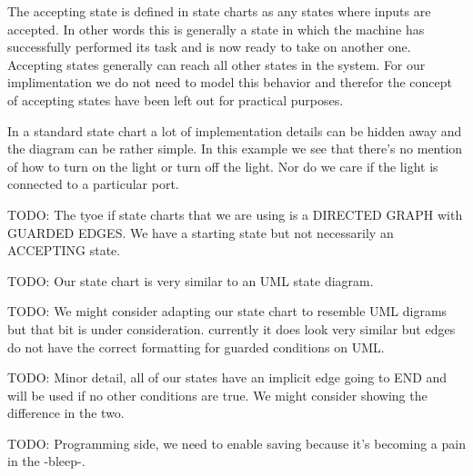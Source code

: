The accepting state is defined in state charts as any states where inputs are accepted. In other words this is generally a state in which the machine has successfully performed its task and is now ready to take on another one. Accepting states generally can reach all other states in the system. For our implimentation we do not need to model this behavior and therefor the concept of accepting states have been left out for practical purposes.

In a standard state chart a lot of implementation details can be hidden away and the diagram can be rather simple. In this example we see that there's no mention of how to turn on the light or turn off the light. Nor do we care if the light is connected to a particular port.

TODO: The tyoe if state charts that we are using is a DIRECTED GRAPH with GUARDED EDGES. We have a starting state but not necessarily an ACCEPTING state.

TODO: Our state chart is very similar to an UML state diagram.

TODO: We might consider adapting our state chart to resemble UML digrams but that bit is under consideration. currently it does look very similar but edges do not have the correct formatting for guarded conditions on UML.

TODO: Minor detail, all of our states have an implicit edge going to END and will be used if no other conditions are true. We might consider showing the difference in the two.

TODO: Programming side, we need to enable saving because it's becoming a pain in the -bleep-.
